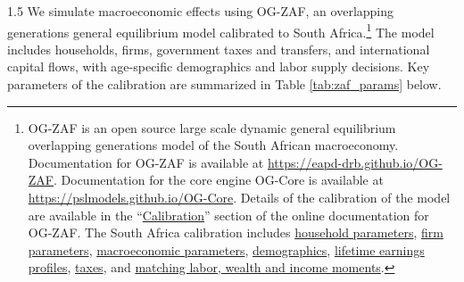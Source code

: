 \documentclass[letterpaper,12pt]{article}
\theoremstyle{definition}
\begin{document}
\begin{spacing}{1.5}
We simulate macroeconomic effects using OG-ZAF, an overlapping generations general equilibrium model calibrated to South Africa.\footnote{OG-ZAF is an open source large scale dynamic general equilibrium overlapping generations model of the South African macroeconomy. Documentation for OG-ZAF is available at \href{https://eapd-drb.github.io/OG-ZAF}{https://eapd-drb.github.io/OG-ZAF}. Documentation for the core engine OG-Core is available at \href{https://pslmodels.github.io/OG-Core}{https://pslmodels.github.io/OG-Core}. Details of the calibration of the model are available in the ``\href{https://eapd-drb.github.io/OG-ZAF/content/calibration/households.html}{Calibration}'' section of the online documentation for OG-ZAF. The South Africa calibration includes \href{https://eapd-drb.github.io/OG-ZAF/content/calibration/households.html}{household parameters}, \href{https://eapd-drb.github.io/OG-ZAF/content/calibration/firms.html}{firm parameters}, \href{https://eapd-drb.github.io/OG-ZAF/content/calibration/macro.html}{macroeconomic parameters}, \href{https://eapd-drb.github.io/OG-ZAF/content/calibration/demographics.html}{demographics}, \href{https://eapd-drb.github.io/OG-ZAF/content/calibration/earnings.html}{lifetime earnings profiles}, \href{https://eapd-drb.github.io/OG-ZAF/content/calibration/taxes.html}{taxes}, and \href{https://eapd-drb.github.io/OG-ZAF/content/calibration/matching_lwi.html}{matching labor, wealth and income moments}.} The model includes households, firms, government taxes and transfers, and international capital flows, with age-specific demographics and labor supply decisions.  Key parameters of the calibration are summarized in Table \ref{tab:zaf_params} below.



\end{spacing}
\end{document}
